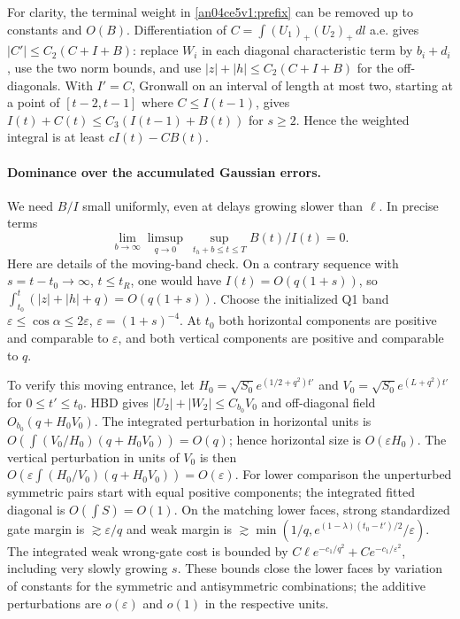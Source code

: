 \documentclass[11pt]{article}
\newcommand{\dd}{\,dl}
\newcommand{\eps}{\varepsilon}
\begin{document}
For clarity, the terminal weight in \eqref{an04ce5v1:prefix} can be removed
up to constants and $O(B)$. Differentiation of
$C=\int(U_1)_+(U_2)_+\dd$ a.e. gives $|C'|\le C_2(C+I+B)$:
replace $W_i$ in each diagonal characteristic term by $b_i+d_i$,
use the two norm bounds, and use
$|z|+|h|\le C_2(C+I+B)$ for the off-diagonals.
With $I'=C$, Gronwall on an interval of length at most two,
starting at a point of $[t-2,t-1]$ where $C\le I(t-1)$, gives
$I(t)+C(t)\le C_3(I(t-1)+B(t))$ for $s\ge2$. Hence the weighted integral
is at least $cI(t)-CB(t)$.

\paragraph{Dominance over the accumulated Gaussian errors.}
We need $B/I$ small uniformly, even at delays growing slower than $\ell$.
In precise terms
\begin{equation}
 \lim_{b\to\infty}\limsup_{q\to0}\ \sup_{t_h+b\le t\le T} B(t)/I(t)=0 .
 \label{an04ce5v1:uniform}
\end{equation}
Here are details of the moving-band check. On a contrary sequence with
$s=t-t_0\to\infty$, $t\le t_R$, one would have $I(t)=O(q(1+s))$,
so $\int_{t_0}^t(|z|+|h|+q)=O(q(1+s))$. Choose the initialized Q1 band
$\eps\le\cos\alpha\le2\eps$, $\eps=(1+s)^{-4}$.
At $t_0$ both horizontal components are positive and comparable to $\eps$,
and both vertical components are positive and comparable to $q$.

To verify this moving entrance, let
$H_0=\sqrt{S_0}e^{(1/2+q^2)t'}$ and
$V_0=\sqrt{S_0}e^{(L+q^2)t'}$ for $0\le t'\le t_0$.
HBD gives $|U_2|+|W_2|\le C_{b_0}V_0$ and off-diagonal field
$O_{b_0}(q+H_0V_0)$. The integrated perturbation in horizontal units is
$O(\int (V_0/H_0)(q+H_0V_0))=O(q)$; hence horizontal size is
$O(\eps H_0)$. The vertical perturbation in units of $V_0$ is then
$O(\eps\int (H_0/V_0)(q+H_0V_0))=O(\eps)$.
For lower comparison the unperturbed symmetric pairs start with equal
positive components; the integrated fitted diagonal is $O(\int S)=O(1)$.
On the matching lower faces, strong standardized gate margin is
$\gtrsim\eps/q$ and weak margin is
$\gtrsim\min(1/q,e^{(1-\lambda)(t_0-t')/2}/\eps)$.
The integrated weak wrong-gate cost is bounded by
$C\ell e^{-c_1/q^2}+C e^{-c_1/\eps^2}$, including very slowly growing
$s$. These bounds close the lower faces by variation of constants for the
symmetric and antisymmetric combinations; the additive perturbations are
$o(\eps)$ and $o(1)$ in the respective units.
\end{document}
